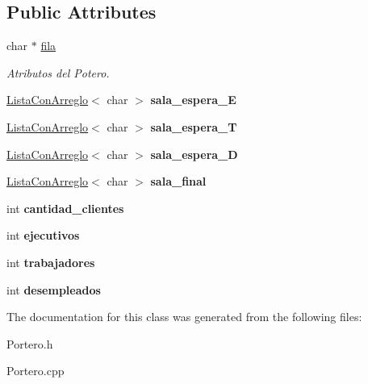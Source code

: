 \subsection*{Public Attributes}
\begin{DoxyCompactItemize}
\item 
\hypertarget{class_portero_af647147300727120b6c11c195923d79a}{char $\ast$ \hyperlink{class_portero_af647147300727120b6c11c195923d79a}{fila}}\label{class_portero_af647147300727120b6c11c195923d79a}

\begin{DoxyCompactList}\small\item\em Atributos del Potero. \end{DoxyCompactList}\item 
\hypertarget{class_portero_a379a422542277f39f9b4caf7ea9bdce8}{\hyperlink{class_lista_con_arreglo}{Lista\+Con\+Arreglo}$<$ char $>$ {\bfseries sala\+\_\+espera\+\_\+\+E}}\label{class_portero_a379a422542277f39f9b4caf7ea9bdce8}

\item 
\hypertarget{class_portero_a0f7243f7d491ed2dd7c2e2c1391ca3f3}{\hyperlink{class_lista_con_arreglo}{Lista\+Con\+Arreglo}$<$ char $>$ {\bfseries sala\+\_\+espera\+\_\+\+T}}\label{class_portero_a0f7243f7d491ed2dd7c2e2c1391ca3f3}

\item 
\hypertarget{class_portero_af639be54624551e0b057e5f61959d0a9}{\hyperlink{class_lista_con_arreglo}{Lista\+Con\+Arreglo}$<$ char $>$ {\bfseries sala\+\_\+espera\+\_\+\+D}}\label{class_portero_af639be54624551e0b057e5f61959d0a9}

\item 
\hypertarget{class_portero_a44df5db8f8efbbeb2ba2703b54b3818a}{\hyperlink{class_lista_con_arreglo}{Lista\+Con\+Arreglo}$<$ char $>$ {\bfseries sala\+\_\+final}}\label{class_portero_a44df5db8f8efbbeb2ba2703b54b3818a}

\item 
\hypertarget{class_portero_ae8b48dbbca5c00251b1a2434a8bbe4e3}{int {\bfseries cantidad\+\_\+clientes}}\label{class_portero_ae8b48dbbca5c00251b1a2434a8bbe4e3}

\item 
\hypertarget{class_portero_a219dc18f72eb4625b3038ddd51491e26}{int {\bfseries ejecutivos}}\label{class_portero_a219dc18f72eb4625b3038ddd51491e26}

\item 
\hypertarget{class_portero_a57f0dc04400c99f82db321ffc379d207}{int {\bfseries trabajadores}}\label{class_portero_a57f0dc04400c99f82db321ffc379d207}

\item 
\hypertarget{class_portero_ab247c04b02ac2034e32ffa4c43655cb7}{int {\bfseries desempleados}}\label{class_portero_ab247c04b02ac2034e32ffa4c43655cb7}

\end{DoxyCompactItemize}


The documentation for this class was generated from the following files\+:\begin{DoxyCompactItemize}
\item 
Portero.\+h\item 
Portero.\+cpp\end{DoxyCompactItemize}
